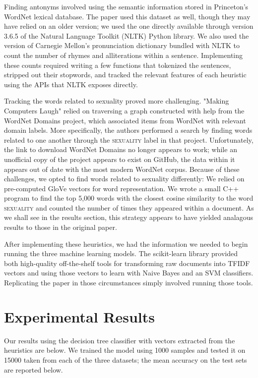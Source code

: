 \documentclass[11pt,a4paper]{article}
\begin{document}
Finding antonyms involved using the semantic information stored in Princeton's WordNet lexical database. The paper used this dataset as well, though they may have relied on an older version; we used the one directly available through version 3.6.5 of the Natural Language Toolkit (NLTK) Python library. \cite{10.5555/1717171} We also used the version of Carnegie Mellon's pronunciation dictionary bundled with NLTK to count the number of rhymes and alliterations within a sentence. Implementing these counts required writing a few functions that tokenized the sentences, stripped out their stopwords, and tracked the relevant features of each heuristic using the APIs that NLTK exposes directly.

Tracking the words related to sexuality proved more challenging. "Making Computers Laugh" relied on traversing a graph constructed with help from the WordNet Domains project, which associated items from WordNet with relevant domain labels. More specifically, the authors performed a search by finding words related to one another through the \textsc{sexuality} label in that project. Unfortunately, the link to download WordNet Domains no longer appears to work; while an unofficial copy of the project appears to exist on GitHub, the data within it appears out of date with the most modern WordNet corpus. Because of these challenges, we opted to find words related to sexuality differently: We relied on pre-computed GloVe vectors for word representation. We wrote a small C++ program to find the top 5,000 words with the closest cosine similarity to the word \textsc{sexuality} and counted the number of times they appeared within a document. As we shall see in the results section, this strategy appears to have yielded analagous results to those in the original paper.

After implementing these heuristics, we had the information we needed to begin running the three machine learning models. The scikit-learn library provided both high-quality off-the-shelf tools for transforming raw documents into TFIDF vectors and using those vectors to learn with Naive Bayes and an SVM classifiers. \cite{sklearn_api} Replicating the paper in those circumstances simply involved running those tools.

\section{Experimental Results}

Our results using the decision tree classifier with vectors extracted from the heuristics are below. We trained the model using 1000 samples and tested it on 15000 taken from each of the three datasets; the mean accuracy on the test sets are reported below.
\end{document}
